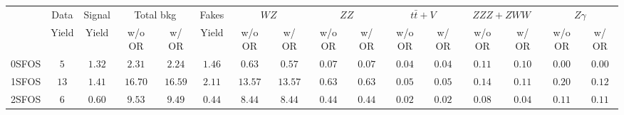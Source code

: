 \begin{tabular}{l||c|c|c|c||c|c|c|c|c|c|c|c|c|c|c}
\hline
 
 &                 Data    &  Signal    & \multicolumn{2}{c||}{Total bkg} &  Fakes & \multicolumn{2}{c|}{$WZ$} & \multicolumn{2}{c|}{$ZZ$} & \multicolumn{2}{c|}{$t\bar{t}+V$} & \multicolumn{2}{c|}{$ZZZ+ZWW$} & \multicolumn{2}{c}{$Z\gamma$} \\ 
 & Yield & Yield & w/o OR & w/ OR & Yield & w/o OR & w/ OR & w/o OR & w/ OR & w/o OR & w/ OR & w/o OR & w/ OR & w/o OR & w/ OR \\ 
 
 
\hline \hline
0SFOS &  $5$  &  $1.32$ & $2.31$ & $2.24$ & $1.46$ &  $0.63$ &  $0.57$ &  $0.07$ &  $0.07$ & $0.04$ &  $0.04$ &  $0.11$ &  $0.10$ & $0.00$ & $0.00$  \\ 
1SFOS &  $13$  &  $1.41$ & $16.70$ & $16.59$ & $2.11$ &  $13.57$ &  $13.57$ &  $0.63$ &  $0.63$ &  $0.05$ & $0.05$ &  $0.14$ &  $0.11$ &  $0.20$  & $0.12$  \\ 
2SFOS &  $6$  &  $0.60$ & $9.53$ & $9.49$ & $0.44$ &  $8.44$ &  $8.44$ &  $0.44$ &  $0.44$ &  $0.02$ & $0.02$ &  $0.08$ &  $0.04$ &  $0.11$  & $0.11$  \\ 
\hline
\end{tabular}



